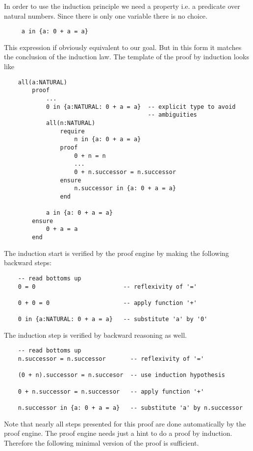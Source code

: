 In order to use the induction principle we need a property i.e. a predicate
over natural numbers. Since there is only one variable there is no choice.
\begin{lstlisting}
     a in {a: 0 + a = a}
\end{lstlisting}
This expression if obviously equivalent to our goal. But in this form it
matches the conclusion of the induction law. The template of the proof by
induction looks like
\begin{lstlisting}
    all(a:NATURAL)
        proof
            ...
            0 in {a:NATURAL: 0 + a = a}  -- explicit type to avoid
                                         -- ambiguities
            all(n:NATURAL)
                require
                    n in {a: 0 + a = a}
                proof
                    0 + n = n
                    ...
                    0 + n.successor = n.successor
                ensure
                    n.successor in {a: 0 + a = a}
                end

            a in {a: 0 + a = a}
        ensure
            0 + a = a
        end
\end{lstlisting}

The induction start is verified by the proof engine by making the following
backward steps:
\begin{lstlisting}
    -- read bottoms up
    0 = 0                         -- reflexivity of '='

    0 + 0 = 0                     -- apply function '+'

    0 in {a:NATURAL: 0 + a = a}   -- substitute 'a' by '0'
\end{lstlisting}

The induction step is verified by backward reasoning as well.
\begin{lstlisting}
    -- read bottoms up
    n.successor = n.successor       -- reflexivity of '='

    (0 + n).successor = n.succesor  -- use induction hypothesis

    0 + n.successor = n.successor   -- apply function '+'

    n.successor in {a: 0 + a = a}   -- substitute 'a' by n.successor 
\end{lstlisting}

Note that nearly all steps presented for this proof are done automatically by
the proof engine. The proof engine needs just a hint to do a proof by
induction. Therefore the following minimal version of the proof is sufficient.

